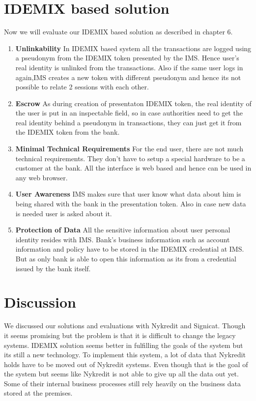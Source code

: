 \section{IDEMIX based solution}
Now we will evaluate our IDEMIX based solution as described in chapter 6. 
\begin{enumerate}
	\item{\textbf{Unlinkability}}
	In IDEMIX based system all the transactions are logged using a pseudonym from the IDEMIX token presented by the IMS. Hence user's real identity is unlinked from the transactions. Also if the same user logs in again,IMS creates a new token with different pseudonym and hence its not possible to relate 2 sessions with each other.
	\item{\textbf{Escrow}}
	As during creation of presentaton IDEMIX token, the real identity of the user is put in an inspectable field, so in case authorities need to get the real identity behind a pseudonym in transactions, they can just get it from the IDEMIX token from the bank.
	\item{\textbf{Minimal Technical Requirements}}
	For the end user, there are not much technical requirements. They don't have to setup a special hardware to be a customer at the bank. All the interface is web based and hence can be used in any web browser. 
	\item{\textbf{User Awareness}}
	IMS makes sure that user know what data about him is being shared with the bank in the presentation token. Also in case new data is needed user is asked about it.
	\item{\textbf{Protection of Data}}
	All the sensitive information about user personal identity resides with IMS. Bank's business information such as account information and policy have to be stored in the IDEMIX credential at IMS. But as only bank is able to open this information as its from a credential issued by the bank itself.
\end{enumerate}
\section{Discussion}
We discussed our solutions and evaluations with Nykredit and Signicat. Though it seems promising but the problem is that it is difficult to change the legacy systems. IDEMIX solution seems better in fulfilling the goals of the system but its still a new technology. To implement this system, a lot of data that Nykredit holds have to be moved out of Nykredit systems. Even though that is the goal of the system but seems like Nykredit is not able to give up all the data out yet. Some of their internal business processes still rely heavily on the business data stored at the premises. 

